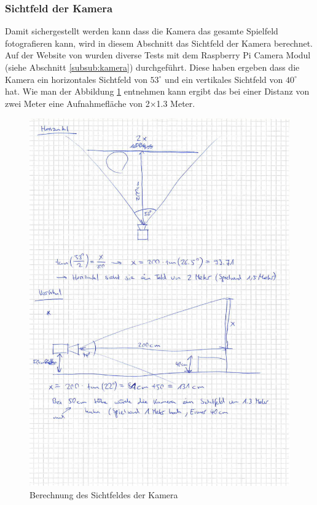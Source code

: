 \subsubsection{Sichtfeld der Kamera}
\label{subsub:sichtfeld-der-kamera}
Damit sichergestellt werden kann dass die Kamera das gesamte Spielfeld fotografieren kann, wird in diesem Abschnitt das Sichtfeld der Kamera berechnet. Auf der Website von \citeauthor{raspberry-pi-camera} \citeyear{raspberry-pi-camera} wurden diverse Tests mit dem Raspberry Pi Camera Modul (siehe Abschnitt \ref{subsub:kamera}) durchgeführt. Diese haben ergeben dass die Kamera ein horizontales Sichtfeld von $53^\circ$ und ein vertikales Sichtfeld von $40^\circ$ hat. Wie man der Abbildung \ref{fig:berechnung_sichtfeld} entnehmen kann ergibt das bei einer Distanz von zwei Meter eine Aufnahmefläche von 2×1.3 Meter.

\begin{figure}[h!]
\centering
\includegraphics[width=0.6\linewidth]{../../fig/berechnung_sichtfeld.pdf}
\caption{Berechnung des Sichtfeldes der Kamera}
\label{fig:berechnung_sichtfeld}
\end{figure}
